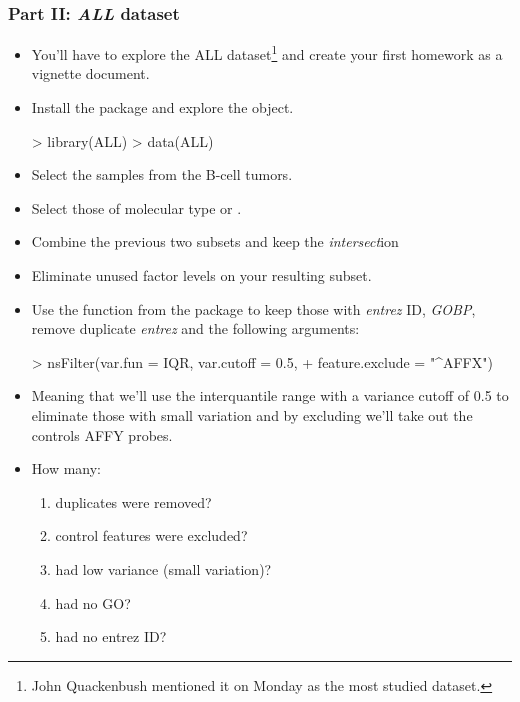 \begin{frame}
  \frametitle{Part II: \emph{ALL} dataset}
  \begin{itemize}
  \item You'll have to explore the ALL dataset\footnote{John Quackenbush mentioned it on Monday as the most studied dataset.} and create your first homework as a vignette document.
  \item Install the  package and explore the  object.
\begin{Schunk}
\begin{Sinput}
> library(ALL)
> data(ALL)
\end{Sinput}
\end{Schunk}
  \item Select the samples from the B-cell tumors.
  \item Select those of molecular type  or .
  \item Combine the previous two subsets and keep the \emph{intersect}ion
  \item Eliminate unused factor levels on your resulting subset.
  \item Use the  function from the  package to keep those with \emph{entrez} ID, \emph{GOBP}, remove duplicate \emph{entrez} and the following arguments:
\begin{Schunk}
\begin{Sinput}
> nsFilter(var.fun = IQR, var.cutoff = 0.5, 
+     feature.exclude = "^AFFX")
\end{Sinput}
\end{Schunk}
  \item Meaning that we'll use the interquantile range with a variance cutoff of 0.5 to eliminate those with small variation and by excluding  we'll take out the controls AFFY probes.
  \item How many:
  \begin{enumerate}
  \item duplicates were removed?
  \item control features were excluded?
  \item had low variance (small variation)?
  \item had no GO?
  \item had no entrez ID?
  \end{enumerate}
  \end{itemize}
\end{frame}

